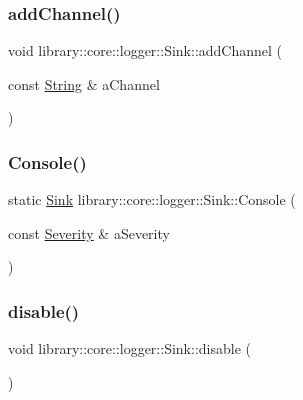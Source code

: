 \subsubsection{\texorpdfstring{addChannel()}{addChannel()}}
{\footnotesize\ttfamily void library\+::core\+::logger\+::\+Sink\+::add\+Channel (\begin{DoxyParamCaption}\item[{const \mbox{\hyperlink{classlibrary_1_1core_1_1types_1_1_string}{String}} \&}]{a\+Channel }\end{DoxyParamCaption})}

\mbox{\label{classlibrary_1_1core_1_1logger_1_1_sink_ae3a2c4036340751f16a32e428a9c168a}} 
\subsubsection{\texorpdfstring{Console()}{Console()}}
{\footnotesize\ttfamily static \mbox{\hyperlink{classlibrary_1_1core_1_1logger_1_1_sink}{Sink}} library\+::core\+::logger\+::\+Sink\+::\+Console (\begin{DoxyParamCaption}\item[{const \mbox{\hyperlink{namespacelibrary_1_1core_1_1logger_a35f71353edf64f68f7fe3874b01abaa8}{Severity}} \&}]{a\+Severity }\end{DoxyParamCaption})\hspace{0.3cm}{\ttfamily [static]}}

\mbox{\label{classlibrary_1_1core_1_1logger_1_1_sink_a94d8e1a986d1b105623ee86c91ad491c}} 
\subsubsection{\texorpdfstring{disable()}{disable()}}
{\footnotesize\ttfamily void library\+::core\+::logger\+::\+Sink\+::disable (\begin{DoxyParamCaption}{ }\end{DoxyParamCaption})}

\mbox{\label{classlibrary_1_1core_1_1logger_1_1_sink_a726fd3b9e1c3a914fd4913d746656202}} 
